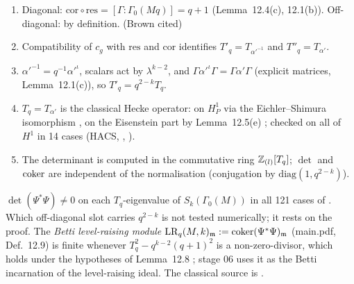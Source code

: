 \begin{outline}
\begin{enumerate}[label=(\arabic*)]
\item Diagonal: $\mathrm{cor}\circ\mathrm{res}=[\Gamma:\Gamma_0(Mq)]=q+1$ (Lemma~12.4(c), 12.1(b)). Off-diagonal: by definition. \stpmc{} (Brown cited)
\item Compatibility of $c_g$ with $\mathrm{res}$ and $\mathrm{cor}$ identifies $T'_q=T_{\alpha'^{-1}}$ and $T''_q=T_{\alpha'}$. \stpmc
\item $\alpha'^{-1}=q^{-1}\alpha'^\iota$, scalars act by $\lambda^{k-2}$, and $\Gamma\alpha'^\iota\Gamma=\Gamma\alpha'\Gamma$ (explicit matrices, Lemma~12.1(c)), so $T'_q=q^{2-k}T_q$. \stproved
\item $T_q=T_{\alpha'}$ is the classical Hecke operator: on $H^1_P$ via the Eichler--Shimura isomorphism \cite[\S6.3, Thm.~1, p.~177]{Hi93} \stcited, on the Eisenstein part by
  Lemma~12.5(e) \stpmc; checked on all of $H^1$ in 14 cases (HACS, , \stcomp).
\item The determinant is computed in the commutative ring $\mathbb{Z}_{(l)}[T_q]$; $\det$ and $\operatorname{coker}$ are independent of the normalisation (conjugation by $\mathrm{diag}(1,q^{2-k})$). \stproved
\end{enumerate}
$\det(\Psi^*\Psi)\ne0$ on each $T_q$-eigenvalue of $S_k(\Gamma_0(M))$ in all 121 cases of  \stcomp. Which off-diagonal slot carries $q^{2-k}$ is
not tested numerically; it rests on the proof. The \emph{Betti level-raising module} $\mathrm{LR}_q(M,k)_{\mathfrak{m}}:=\operatorname{coker}(\Psi^*\Psi)_{\mathfrak{m}}$ (main.pdf, Def.~12.9) is finite whenever
$T_q^2-q^{k-2}(q+1)^2$ is a non-zero-divisor, which holds under the hypotheses of Lemma~12.8 \stproved; stage 06 uses it as the Betti incarnation of the
level-raising ideal. The classical source is \cite[\S2--3]{Ri84} \stcited.
\end{outline}

